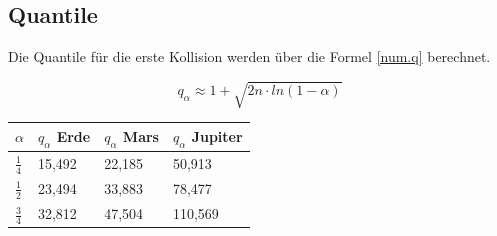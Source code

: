 \documentclass[../main.tex]{subfiles}
\begin{document}
    \subsection{Quantile}

    Die Quantile für die erste Kollision werden über die Formel \ref{num.q} berechnet.

    \begin{equation}
        q_{\alpha} \approx 1 + \sqrt{2n \cdot ln(1-\alpha)}
        \label{num.q}
    \end{equation}

    \begin{table}[h]
        \centering
        \begin{tabular}{|l|l|l|l|}
            \hline
            $\alpha$      & $q_{\alpha}$ Erde & $q_{\alpha}$ Mars & $q_{\alpha}$ Jupiter \\ \hline
            $\frac{1}{4}$ & 15,492            & 22,185            & 50,913               \\
            $\frac{1}{2}$ & 23,494            & 33,883            & 78,477               \\
            $\frac{3}{4}$ & 32,812            & 47,504            & 110,569              \\ \hline
        \end{tabular}
    \end{table}
\end{document}
